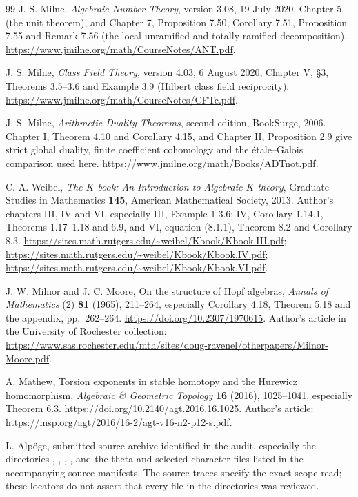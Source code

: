 \begin{thebibliography}{99}
J. S. Milne, \emph{Algebraic Number Theory}, version 3.08,
19 July 2020, Chapter 5 (the unit theorem), and Chapter 7,
Proposition 7.50, Corollary 7.51, Proposition 7.55 and Remark 7.56
(the local unramified and totally ramified decomposition).
\url{https://www.jmilne.org/math/CourseNotes/ANT.pdf}.

J. S. Milne, \emph{Class Field Theory}, version 4.03,
6 August 2020, Chapter V, \S3, Theorems 3.5--3.6 and
Example 3.9 (Hilbert class field reciprocity).
\url{https://www.jmilne.org/math/CourseNotes/CFTc.pdf}.

J. S. Milne, \emph{Arithmetic Duality Theorems}, second edition,
BookSurge, 2006. Chapter I, Theorem 4.10 and Corollary 4.15,
and Chapter II, Proposition 2.9 give strict global duality, finite
coefficient cohomology and the \'etale--Galois comparison used here.
\url{https://www.jmilne.org/math/Books/ADTnot.pdf}.

C. A. Weibel, \emph{The $K$-book: An Introduction to Algebraic $K$-theory},
Graduate Studies in Mathematics \textbf{145}, American Mathematical
Society, 2013. Author's chapters III, IV and VI, especially III,
Example 1.3.6; IV,
Corollary 1.14.1, Theorems 1.17--1.18 and 6.9, and VI,
equation (8.1.1), Theorem 8.2 and Corollary 8.3.
\url{https://sites.math.rutgers.edu/~weibel/Kbook/Kbook.III.pdf};
\url{https://sites.math.rutgers.edu/~weibel/Kbook/Kbook.IV.pdf};
\url{https://sites.math.rutgers.edu/~weibel/Kbook/Kbook.VI.pdf}.

J. W. Milnor and J. C. Moore, On the structure of Hopf algebras,
\emph{Annals of Mathematics} (2) \textbf{81} (1965), 211--264,
especially Corollary 4.18, Theorem 5.18 and the appendix,
pp.\ 262--264.
\url{https://doi.org/10.2307/1970615}.
Author's article in the University of Rochester collection:
\url{https://www.sas.rochester.edu/mth/sites/doug-ravenel/otherpapers/Milnor-Moore.pdf}.

A. Mathew, Torsion exponents in stable homotopy and the Hurewicz
homomorphism, \emph{Algebraic \& Geometric Topology}
\textbf{16} (2016), 1025--1041, especially Theorem 6.3.
\url{https://doi.org/10.2140/agt.2016.16.1025}.
Author's article:
\url{https://msp.org/agt/2016/16-2/agt-v16-n2-p12-s.pdf}.

L. Alp\"oge, submitted source archive identified in the audit,
especially the directories
,
,
,
, and the theta and
selected-character files listed in the accompanying source manifests.
The source traces specify the exact scope read; these locators do not
assert that every file in the directories was reviewed.


\end{thebibliography}
